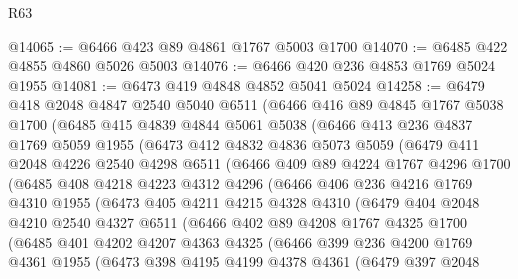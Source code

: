 \begin{lexlean}{R63}
\begin{coremodule}
@14065 := @6466 @423 @89 @4861 @1767 @5003 @1700
@14070 := @6485 @422 @4855 @4860 @5026 @5003
@14076 := @6466 @420 @236 @4853 @1769 @5024 @1955
@14081 := @6473 @419 @4848 @4852 @5041 @5024
@14258 := @6479
    @418
    @2048
    @4847
    @2540
    @5040
    @6511
    (@6466
      @416
      @89
      @4845
      @1767
      @5038
      @1700
      (@6485
        @415
        @4839
        @4844
        @5061
        @5038
        (@6466
          @413
          @236
          @4837
          @1769
          @5059
          @1955
          (@6473
            @412
            @4832
            @4836
            @5073
            @5059
            (@6479
              @411
              @2048
              @4226
              @2540
              @4298
              @6511
              (@6466
                @409
                @89
                @4224
                @1767
                @4296
                @1700
                (@6485
                  @408
                  @4218
                  @4223
                  @4312
                  @4296
                  (@6466
                    @406
                    @236
                    @4216
                    @1769
                    @4310
                    @1955
                    (@6473
                      @405
                      @4211
                      @4215
                      @4328
                      @4310
                      (@6479
                        @404
                        @2048
                        @4210
                        @2540
                        @4327
                        @6511
                        (@6466
                          @402
                          @89
                          @4208
                          @1767
                          @4325
                          @1700
                          (@6485
                            @401
                            @4202
                            @4207
                            @4363
                            @4325
                            (@6466
                              @399
                              @236
                              @4200
                              @1769
                              @4361
                              @1955
                              (@6473
                                @398
                                @4195
                                @4199
                                @4378
                                @4361
                                (@6479
                                  @397
                                  @2048

\end{coremodule}
\end{lexlean}
